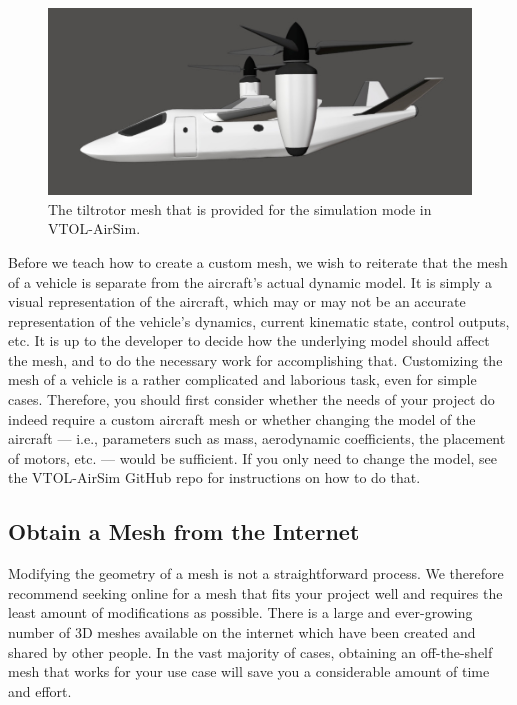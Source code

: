 \begin{figure}[t]
    \centering
    \includegraphics[width=\textwidth]{figures/tiltrotor_mesh}
    \caption[Default tiltrotor mesh]{
        The tiltrotor mesh that is provided for the  simulation mode in VTOL-AirSim.}%
    \label{fig:tiltrotor_mesh}
\end{figure}

Before we teach how to create a custom mesh, we wish to reiterate that the mesh of a vehicle is separate from the aircraft's actual dynamic model. It is simply a visual representation of the aircraft, which may or may not be an accurate representation of the vehicle's dynamics, current kinematic state, control outputs, etc. It is up to the developer to decide how the underlying model should affect the mesh, and to do the necessary work for accomplishing that. Customizing the mesh of a vehicle is a rather complicated and laborious task, even for simple cases. Therefore, you should first consider whether the needs of your project do indeed require a custom aircraft mesh or whether changing the model of the aircraft --- i.e., parameters such as mass, aerodynamic coefficients, the placement of motors, etc. --- would be sufficient. If you only need to change the model, see the VTOL-AirSim GitHub repo for instructions on how to do that.


\subsection{Obtain a Mesh from the Internet}
Modifying the geometry of a mesh is not a straightforward process. We therefore recommend seeking online for a mesh that fits your project well and requires the least amount of modifications as possible. There is a large and ever-growing number of 3D meshes available on the internet which have been created and shared by other people. In the vast majority of cases, obtaining an off-the-shelf mesh that works for your use case will save you a considerable amount of time and effort.

